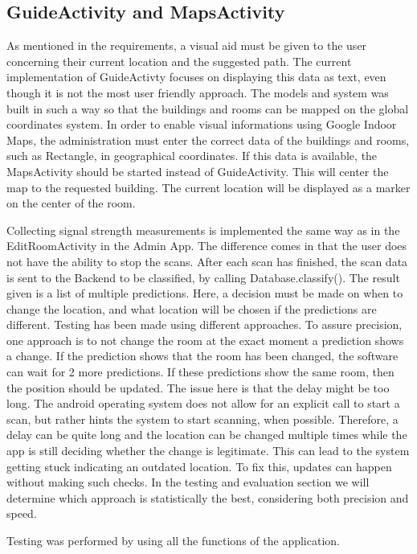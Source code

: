 \subsection{GuideActivity and MapsActivity}
As mentioned in the requirements, a visual aid must be given to the user concerning their current location and the suggested path. The current implementation of GuideActivty focuses on displaying this data as text, even though it is not the most user friendly approach. The models and system was built in such a way so that the buildings and rooms can be mapped on the global coordinates system. In order to enable visual informations using Google Indoor Maps, the administration must enter the correct data of the buildings and rooms, such as Rectangle, in geographical coordinates. If this data is available, the MapsActivity should be started instead of GuideActivity. This will center the map to the requested building. The current location will be displayed as a marker on the center of the room.

\noindent
Collecting signal strength measurements is implemented the same way as in the EditRoomActivity in the Admin App. The difference comes in that the user does not have the ability to stop the scans. After each scan has finished, the scan data is sent to the Backend to be classified, by calling Database.classify(). The result given is a list of multiple predictions. Here, a decision must be made on when to change the location, and what location will be chosen if the predictions are different. Testing has been made using different approaches. To assure precision, one approach is to not change the room at the exact moment a prediction shows a change. If the prediction shows that the room has been changed, the software can wait for 2 more predictions. If these predictions show the same room, then the position should be updated. The issue here is that the delay might be too long. The android operating system does not allow for an explicit call to start a scan, but rather hints the system to start scanning, when possible. Therefore, a delay can be quite long and the location can be changed multiple times while the app is still deciding whether the change is legitimate. This can lead to the system getting stuck indicating an outdated location. To fix this, updates can happen without making such checks. In the testing and evaluation section we will determine which approach is statistically the best, considering both precision and speed.

Testing was performed by using all the functions of the application.
